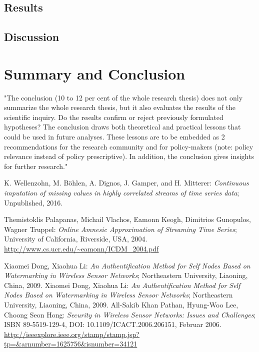 \documentclass[abstracton,12pt]{scrreprt}
\begin{document}
\section{Results}
\section{Discussion}

\chapter{Summary and Conclusion}
\label{sec:Summary}
"The conclusion (10 to 12 per cent of the whole research thesis) does not only summarize the whole research thesis, but it also evaluates the results of the scientific inquiry. Do the results confirm or reject previously formulated hypotheses? The conclusion draws both theoretical and practical lessons that could be used in future analyses. These lessons are to be embedded as
2
recommendations for the research community and for policy-makers (note: policy relevance instead of policy prescriptive). In addition, the conclusion gives insights for further research."

\begin{thebibliography}{99}
	
	
	 K. Wellenzohn, M. Böhlen, A. Dignos, J. Gamper, and H. Mitterer: \emph{Continuous imputation of missing values in highly correlated streams of time series data}; Unpublished, 2016.
	
	 Themistoklis Palapanas, Michail Vlachos, Eamonn Keogh, Dimitrios Gunopulos, Wagner Truppel: \emph{Online Amnesic Approximation of Streaming Time Series}; University of California, Riverside, USA, 2004. \url{http://www.cs.ucr.edu/~eamonn/ICDM_2004.pdf}
	
	 Xiaomei Dong, Xiaohua Li: \emph{An Authentification Method for Self Nodes Based on Watermarking in Wireless Sensor Networks}; Northeastern University, Liaoning, China, 2009.
	 Xiaomei Dong, Xiaohua Li: \emph{An Authentification Method for Self Nodes Based on Watermarking in Wireless Sensor Networks}; Northeastern University, Liaoning, China, 2009.
	 All-Sakib Khan Pathan, Hyung-Woo Lee, Choong Seon Hong: \emph{Security in Wireless Sensor Networks: Issues and Challenges}; ISBN 89-5519-129-4, DOI: 10.1109/ICACT.2006.206151, Februar 2006. \url{http://ieeexplore.ieee.org/stamp/stamp.jsp?tp=&arnumber=1625756&isnumber=34121}
		
	



\end{thebibliography}
\end{document}
